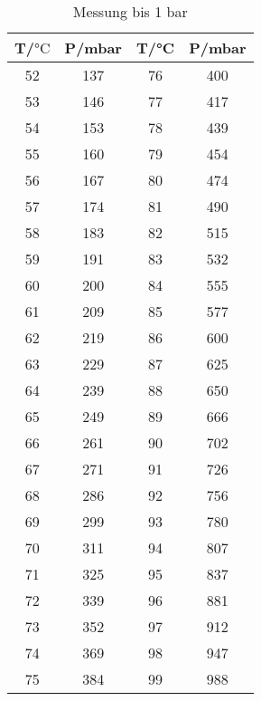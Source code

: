   \begin{table}
    \centering
    \begin{tabular}{c c c c}
      \toprule
      T/$\si{\celsius}$ & P/\si{\milli\bar} & T/\si{\celsius} & P/\si{\milli\bar}
      \\
      \midrule
      52    &   137  &  76  &  400  \\
      53    &   146  &  77  &  417  \\
      54    &   153  &  78  &  439  \\
      55    &   160  &  79  &  454  \\
      56    &   167  &  80  &  474  \\
      57    &   174  &  81  &  490  \\
      58    &   183  &  82  &  515  \\
      59    &   191  &  83  &  532  \\
      60    &   200  &  84  &  555  \\
      61    &   209  &  85  &  577  \\
      62    &   219  &  86  &  600  \\
      63    &   229  &  87  &  625  \\
      64    &   239  &  88  &  650  \\
      65    &   249  &  89  &  666  \\
      66    &   261  &  90  &  702  \\
      67    &   271  &  91  &  726  \\
      68    &   286  &  92  &  756  \\
      69    &   299  &  93  &  780  \\
      70    &   311  &  94  &  807  \\
      71    &   325  &  95  &  837  \\
      72    &   339  &  96  &  881  \\
      73    &   352  &  97  &  912  \\
      74    &   369  &  98  &  947  \\
      75    &   384  &  99  &  988  \\
      \bottomrule
    \end{tabular}
    \caption{Messung bis 1 bar}
    \label{tab:data1}

  \end{table}
